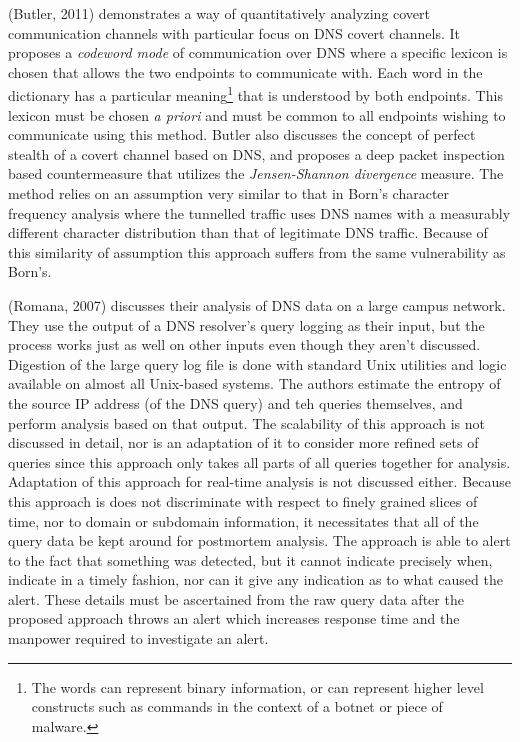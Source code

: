 \documentclass[12pt]{report}
\theoremstyle{remark}
\theoremstyle{definition}
\theoremstyle{definition}
\theoremstyle{definition}
\begin{document}
(Butler, 2011)\cite{Butler2011} demonstrates a way of quantitatively analyzing
covert communication channels with particular focus on DNS covert channels. It
proposes a \emph{codeword mode} of communication over DNS where a specific
lexicon is chosen that allows the two endpoints to communicate with. Each word
in the dictionary has a particular meaning\footnote{The words can represent
binary information, or can represent higher level constructs such as commands in
the context of a botnet or piece of malware.} that is understood by both
endpoints. This lexicon must be chosen \emph{a priori} and must be common to all
endpoints wishing to communicate using this method. Butler also discusses the
concept of perfect stealth of a covert channel based on DNS, and proposes a deep
packet inspection based countermeasure that utilizes the \emph{Jensen-Shannon
divergence} measure. The method relies on an assumption very similar to that in
Born's character frequency analysis where the tunnelled traffic uses DNS names
with a measurably different character distribution than that of legitimate DNS
traffic. Because of this similarity of assumption this approach suffers from the
same vulnerability as Born's.

(Romana, 2007)\cite{Romana2007} discusses their analysis of DNS data on a large
campus network. They use the output of a DNS resolver's query logging as their
input, but the process works just as well on other inputs even though they
aren't discussed. Digestion of the large query log file is done with standard
Unix utilities and logic available on almost all Unix-based systems. The authors
estimate the entropy of the source IP address (of the DNS query) and teh queries
themselves, and perform analysis based on that output. The scalability of this
approach is not discussed in detail, nor is an adaptation of it to consider more
refined sets of queries since this approach only takes all parts of all queries
together for analysis. Adaptation of this approach for real-time analysis is not
discussed either. Because this approach is does not discriminate with respect to
finely grained slices of time, nor to domain or subdomain information, it
necessitates that all of the query data be kept around for postmortem analysis.
The approach is able to alert to the fact that something was detected, but it
cannot indicate precisely when, indicate in a timely fashion, nor can it give
any indication as to what caused the alert. These details must be ascertained
from the raw query data after the proposed approach throws an alert which
increases response time and the manpower required to investigate an alert.
\end{document}
